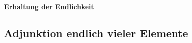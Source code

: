 \documentclass[main.tex]{subfiles}
\begin{document}
\paragraph{Erhaltung der Endlichkeit}

\fi

\subsection{Adjunktion endlich vieler Elemente}

\iffalse
\end{document}
